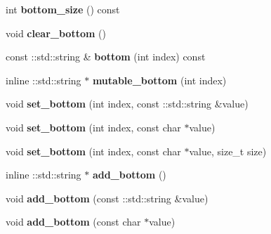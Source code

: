 \begin{DoxyCompactItemize}
int {\bfseries bottom\+\_\+size} () const
\item 
\mbox{\label{classcaffe_1_1_layer_parameter_aa8d0ffa942e5ec6046cc853558247ea6}} 
void {\bfseries clear\+\_\+bottom} ()
\item 
\mbox{\label{classcaffe_1_1_layer_parameter_a1cf5071b872272dffd988da816371546}} 
const \+::std\+::string \& {\bfseries bottom} (int index) const
\item 
\mbox{\label{classcaffe_1_1_layer_parameter_a06da3731dfe02e4923d7a37f6fcac52f}} 
inline \+::std\+::string $\ast$ {\bfseries mutable\+\_\+bottom} (int index)
\item 
\mbox{\label{classcaffe_1_1_layer_parameter_a9d3f5acf205d3495f557317a0e727b9b}} 
void {\bfseries set\+\_\+bottom} (int index, const \+::std\+::string \&value)
\item 
\mbox{\label{classcaffe_1_1_layer_parameter_a15f5fd591fbba0e146486d14fda2d451}} 
void {\bfseries set\+\_\+bottom} (int index, const char $\ast$value)
\item 
\mbox{\label{classcaffe_1_1_layer_parameter_af5d00e4d7da6f447ad8fdaea455bfa7a}} 
void {\bfseries set\+\_\+bottom} (int index, const char $\ast$value, size\+\_\+t size)
\item 
\mbox{\label{classcaffe_1_1_layer_parameter_a62c9fcf9a9a506db1b8499a564a3e2ab}} 
inline \+::std\+::string $\ast$ {\bfseries add\+\_\+bottom} ()
\item 
\mbox{\label{classcaffe_1_1_layer_parameter_a8e3014824ed76e3fb3ae7be130bda741}} 
void {\bfseries add\+\_\+bottom} (const \+::std\+::string \&value)
\item 
\mbox{\label{classcaffe_1_1_layer_parameter_a6019a790be9ed7fa0410aec4d6e54891}} 
void {\bfseries add\+\_\+bottom} (const char $\ast$value)
\item 
\mbox{\label{classcaffe_1_1_layer_parameter_ad1ef3998681e7829f7c45a0602c5c8a3}} 

\end{DoxyCompactItemize}
